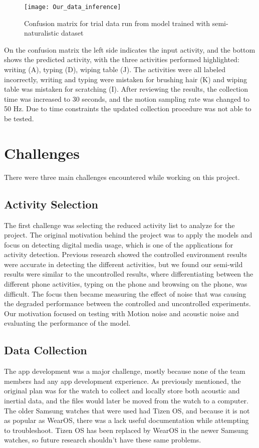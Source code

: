 \documentclass[conference]{IEEEtran}
\begin{document}
	\begin{figure}[h]
		\centering
		\texttt{[image: Our\_data\_inference]}
		\caption{Confusion matrix for trial data run from model trained with semi-naturalistic dataset}
		\label{fig: Our_data_inference}
	\end{figure}
	
	On the confusion matrix the left side indicates the input activity, and the bottom shows the predicted activity, with the three activities performed highlighted: writing (A), typing (D), wiping table (J). 
	The activities were all labeled incorrectly, writing and typing were mistaken for brushing hair (K) and wiping table was mistaken for scratching (I).
	After reviewing the results, the collection time was increased to 30 seconds, and the motion sampling rate was changed to 50 Hz. 
	Due to time constraints the updated collection procedure was not able to be tested.
	
	\section{Challenges}
	There were three main challenges encountered while working on this project. 
	\subsection{Activity Selection}
	The first challenge was selecting the reduced activity list to analyze for the project.
	The original motivation behind the project was to apply the models and focus on detecting digital media usage, which is one of the applications for activity detection. 
	Previous research showed the controlled environment results were accurate in detecting the different activities, but we found our semi-wild results were similar to the uncontrolled results, where differentiating between the different phone activities, typing on the phone and browsing on the phone, was difficult.
	The focus then became measuring the effect of noise that was causing the degraded performance between the controlled and uncontrolled experiments. Our motivation focused on testing with Motion noise and acoustic noise and evaluating the performance of the model.
	
	
	\subsection{Data Collection}
	The app development was a major challenge, mostly because none of the team members had any app development experience.
	As previously mentioned, the original plan was for the watch to collect and locally store both acoustic and inertial data, and the files would later be moved from the watch to a computer.
	The older Samsung watches that were used had Tizen OS, and because it is not as popular as WearOS, there was a lack useful documentation while attempting to troubleshoot.
	Tizen OS has been replaced by WearOS in the newer Samsung watches, so future research shouldn't have these same problems.
	
\end{document}
